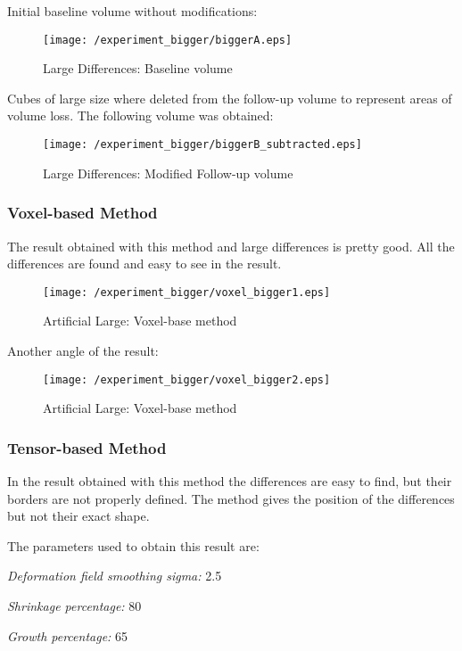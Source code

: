 Initial baseline volume without modifications:

\begin{figure}[H]
  \centering
  \texttt{[image: /experiment\_bigger/biggerA.eps]}
  \caption{Large Differences: Baseline volume}
  \label{largeA}
\end{figure}

Cubes of large size where deleted from the follow-up volume to
represent areas of volume loss. The following volume was obtained:

\begin{figure}[H]
  \centering
  \texttt{[image: /experiment\_bigger/biggerB\_subtracted.eps]}
  \caption{Large Differences: Modified Follow-up volume}
  \label{largeB}
\end{figure}

\subsubsection{Voxel-based Method}
The result obtained with this method and large differences is pretty
good. All the differences are found and easy to see in the result.

\begin{figure}[H]
  \centering
  \texttt{[image: /experiment\_bigger/voxel\_bigger1.eps]}
  \caption{Artificial Large: Voxel-base method}
  \label{voxel_large1}
\end{figure}

Another angle of the result:

\begin{figure}[H]
  \centering
  \texttt{[image: /experiment\_bigger/voxel\_bigger2.eps]}
  \caption{Artificial Large: Voxel-base method}
  \label{voxel_large2}
\end{figure}

\subsubsection{Tensor-based Method}
In the result obtained with this method the differences are easy to
find, but their borders are not properly defined. The method gives the
position of the differences but not their exact shape.

The parameters used to obtain this result are:
\begin{description}
\item \textit{Deformation field smoothing sigma:} 2.5
\item \textit{Shrinkage percentage:} 80
\item \textit{Growth percentage:} 65
\end{description}

